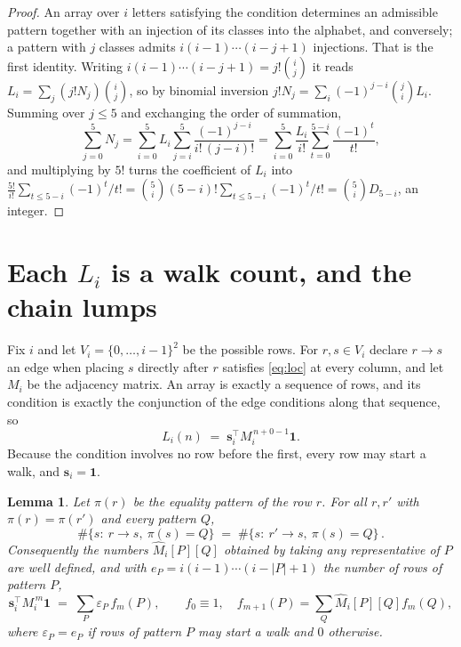 \documentclass[11pt,a4paper]{article}
\theoremstyle{plain}
\newtheorem{lemma}[theorem]{Lemma}
\theoremstyle{definition}
\begin{document}
\begin{proof}
An array over $i$ letters satisfying the condition determines an admissible pattern together
with an injection of its classes into the alphabet, and conversely; a pattern with $j$
classes admits $i(i-1)\cdots(i-j+1)$ injections. That is the first identity. Writing
$i(i-1)\cdots(i-j+1)=j!\binom{i}{j}$ it reads $L_i=\sum_j (j!N_j)\binom{i}{j}$, so by
binomial inversion $j!N_j=\sum_{i}(-1)^{j-i}\binom{j}{i}L_i$. Summing over
$j\le 5$ and exchanging the order of summation,
\[
\sum_{j=0}^{5}N_j=\sum_{i=0}^{5}L_i\sum_{j=i}^{5}\frac{(-1)^{j-i}}{i!\,(j-i)!}
=\sum_{i=0}^{5}\frac{L_i}{i!}\sum_{t=0}^{5-i}\frac{(-1)^t}{t!} ,
\]
and multiplying by $5!$ turns the coefficient of $L_i$ into
$\frac{5!}{i!}\sum_{t\le 5-i}(-1)^t/t!=\binom{5}{i}(5-i)!\sum_{t\le 5-i}(-1)^t/t!
=\binom{5}{i}D_{5-i}$, an integer.
\end{proof}

\section{Each $L_i$ is a walk count, and the chain lumps}

Fix $i$ and let $V_i=\{0,\dots,i-1\}^{2}$ be the possible rows. For $r,s\in V_i$
declare $r\to s$ an edge when placing $s$ directly after $r$ satisfies \eqref{eq:loc} at
every column, and let $M_i$ be the adjacency matrix. An array is exactly a sequence of
rows, and its condition is exactly the conjunction of the edge conditions along that
sequence, so
\[
L_i(n)\;=\;\mathbf{s}_i^{\!\top}M_i^{\,n+0-1}\mathbf{1} .
\]
Because the condition involves no row before the first, every
row may start a walk, and $\mathbf{s}_i=\mathbf{1}$.

\begin{lemma}\label{lem:lump}
Let $\pi(r)$ be the equality pattern of the row $r$. For all $r,r'$ with
$\pi(r)=\pi(r')$ and every pattern $Q$,
\[
\#\{s:\ r\to s,\ \pi(s)=Q\}\;=\;\#\{s:\ r'\to s,\ \pi(s)=Q\}\, .
\]
Consequently the numbers $\widehat M_i[P][Q]$ obtained by taking any representative of $P$
are well defined, and with $e_P=i(i-1)\cdots(i-|P|+1)$ the number of rows of pattern $P$,
\[
\mathbf{s}_i^{\!\top}M_i^{\,m}\mathbf{1}\;=\;\sum_P \varepsilon_P\,f_m(P),
\qquad f_0\equiv1,\quad f_{m+1}(P)=\sum_Q\widehat M_i[P][Q]f_m(Q),
\]
where $\varepsilon_P=e_P$ if rows of pattern $P$ may start a walk and $0$ otherwise.
\end{lemma}
\end{document}

